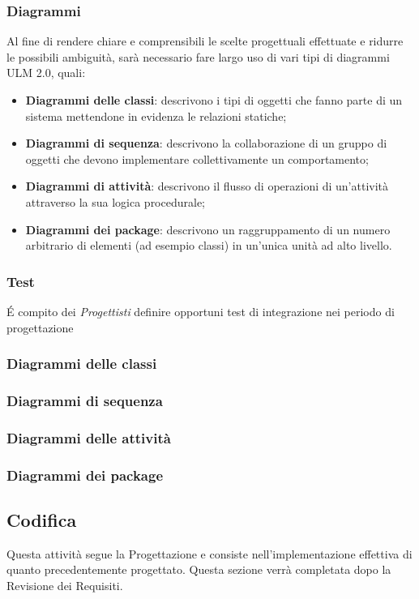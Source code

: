 \subsubsection{Diagrammi}
Al fine di rendere chiare e comprensibili le scelte progettuali effettuate e ridurre le possibili ambiguità, sarà necessario fare largo uso di vari tipi di diagrammi ULM 2.0, quali:
\begin{itemize}
	\item \textbf{Diagrammi delle classi}: descrivono i tipi di oggetti che fanno parte di un sistema mettendone in evidenza le relazioni statiche;
	\item \textbf{Diagrammi di sequenza}: descrivono la collaborazione di un gruppo di oggetti che devono implementare collettivamente un comportamento;
	\item \textbf{Diagrammi di attività}: descrivono il flusso di operazioni di un'attività attraverso la sua logica procedurale;
	\item \textbf{Diagrammi dei package}: descrivono un raggruppamento di un numero arbitrario di elementi (ad esempio classi) in un'unica unità ad alto livello.
\end{itemize}
\subsubsection{Test}
\'E compito dei \textit{Progettisti} definire opportuni test di integrazione nei periodo di progettazione 
\subsubsection{Diagrammi delle classi}
\subsubsection{Diagrammi di sequenza}
\subsubsection{Diagrammi delle attività}
\subsubsection{Diagrammi dei package}

\subsection{Codifica}
Questa attività segue la Progettazione e consiste nell'implementazione effettiva di quanto precedentemente progettato.
Questa sezione verrà completata dopo la Revisione dei Requisiti.
